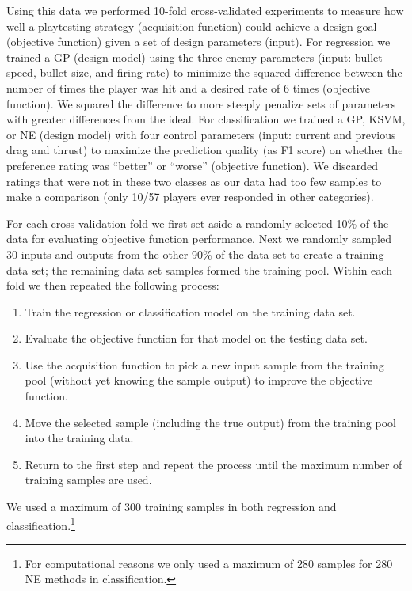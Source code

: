 \documentclass{sig-alternate}
\begin{document}
Using this data we performed 10-fold cross-validated experiments to measure how well a playtesting strategy (acquisition function) could achieve a design goal (objective function) given a set of design parameters (input).
For regression we trained a GP (design model) using the three enemy parameters (input: bullet speed, bullet size, and firing rate) to minimize the squared difference between the number of times the player was hit and a desired rate of 6 times (objective function).
We squared the difference to more steeply penalize sets of parameters with greater differences from the ideal.
For classification we trained a GP, KSVM, or NE (design model) with four control parameters (input: current and previous drag and thrust) to maximize the prediction quality (as F1 score) on whether the preference rating was ``better'' or ``worse'' (objective function).
We discarded ratings that were not in these two classes as our data had too few samples to make a comparison (only 10/57 players ever responded in other categories).


For each cross-validation fold we first set aside a randomly selected 10\% of the data for evaluating objective function performance.
Next we randomly sampled 30 inputs and outputs from the other 90\% of the data set to create a training data set; the remaining data set samples formed the training pool.
Within each fold we then repeated the following process:
\begin{enumerate}
\item Train the regression or classification model on the training data set.
\item Evaluate the objective function for that model on the testing data set.
\item Use the acquisition function to pick a new input sample from the training pool (without yet knowing the sample output) to improve the objective function.
\item Move the selected sample (including the true output) from the training pool into the training data.
\item Return to the first step and repeat the process until the maximum number of training samples are used.
\end{enumerate}
\noindent We used a maximum of 300 training samples in both regression and classification.\footnote{For computational reasons we only used a maximum of 280 samples for 280 NE methods in classification.}
\end{document}
